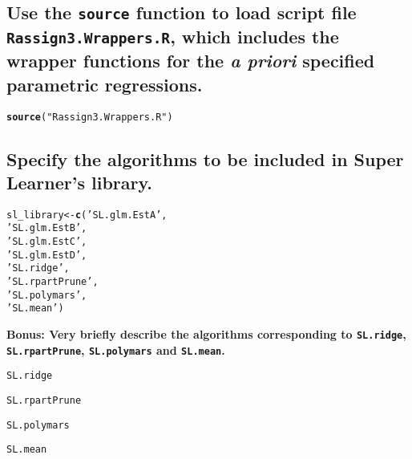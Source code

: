 \documentclass{article}\usepackage[]{graphicx}\usepackage[]{xcolor}
\makeatletter
\newcommand{\hlstr}[1]{\textcolor[rgb]{0.192,0.494,0.8}{#1}}%
\newcommand{\hlstd}[1]{\textcolor[rgb]{0.345,0.345,0.345}{#1}}%
\newcommand{\hlkwb}[1]{\textcolor[rgb]{0.69,0.353,0.396}{#1}}%
\newcommand{\hlkwd}[1]{\textcolor[rgb]{0.737,0.353,0.396}{\textbf{#1}}}%
\newenvironment{kframe}{%
 \def\at@end@of@kframe{}%
 \ifinner\ifhmode%
  \def\at@end@of@kframe{\end{minipage}}%
  \begin{minipage}{\columnwidth}%
 \fi\fi%
 \def\FrameCommand##1{\hskip\@totalleftmargin \hskip-\fboxsep
 \colorbox{shadecolor}{##1}\hskip-\fboxsep
     \hskip-\linewidth \hskip-\@totalleftmargin \hskip\columnwidth}%
 \MakeFramed {\advance\hsize-\width
   \@totalleftmargin\z@ \linewidth\hsize
   \@setminipage}}%
 {\par\unskip\endMakeFramed%
 \at@end@of@kframe}
\newenvironment{knitrout}{}{} %
\makeatother
\begin{document}
  \subsection{Use the \texttt{source} function to load script file \texttt{Rassign3.Wrappers.R}, which includes the wrapper functions for the \textit{a priori} specified parametric regressions.} 
  
\begin{knitrout}
\color{fgcolor}\begin{kframe}
\begin{alltt}
\hlkwd{source}\hlstd{(}\hlstr{"Rassign3.Wrappers.R"}\hlstd{)}
\end{alltt}
\end{kframe}
\end{knitrout}

  \subsection{Specify the algorithms to be included in Super Learner's library.}
  
\begin{knitrout}
\color{fgcolor}\begin{kframe}
\begin{alltt}
\hlstd{sl_library} \hlkwb{<-} \hlkwd{c}\hlstd{(}\hlstr{'SL.glm.EstA'}\hlstd{,}
                \hlstr{'SL.glm.EstB'}\hlstd{,}
                \hlstr{'SL.glm.EstC'}\hlstd{,}
                \hlstr{'SL.glm.EstD'}\hlstd{,}
                \hlstr{'SL.ridge'}\hlstd{,}
                \hlstr{'SL.rpartPrune'}\hlstd{,}
                \hlstr{'SL.polymars'}\hlstd{,}
                \hlstr{'SL.mean'}\hlstd{)}
\end{alltt}
\end{kframe}
\end{knitrout}
  
  
  
\textbf{Bonus: Very briefly describe the algorithms corresponding to \texttt{SL.ridge}, \texttt{SL.rpartPrune}, \texttt{SL.polymars} and \texttt{SL.mean}.}

\begin{knitrout}
\color{fgcolor}\begin{kframe}
\begin{alltt}
\hlstd{SL.ridge}

\hlstd{SL.rpartPrune}

\hlstd{SL.polymars}

\hlstd{SL.mean}
\end{alltt}
\end{kframe}
\end{knitrout}
\end{document}
